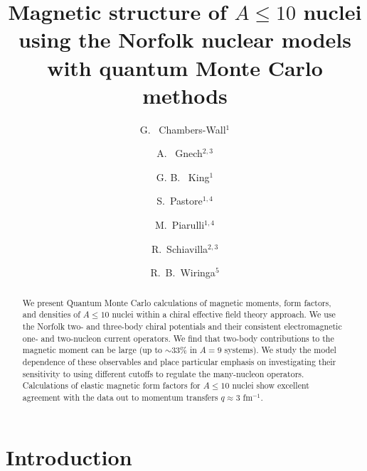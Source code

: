 \documentclass[aps,prc,floatfix,showpacs,twocolumn, preprintnumbers]{revtex4-2}
\begin{document}
\title{Magnetic structure of $A \le 10$ nuclei using the Norfolk nuclear models with quantum Monte Carlo methods}


\author{G. \ Chambers-Wall$^{1}$}
\author{A. \ Gnech$^{2,3}$}
\author{G. B. \ King$^{1}$}
\author{S.\ Pastore$^{1,4}$}
\author{M.\ Piarulli$^{1,4}$}
\author{R.\ Schiavilla$^{2,3}$}
\author{\mbox{R. B.\ Wiringa$^5$}}


\begin{abstract}
We present Quantum Monte Carlo calculations of magnetic moments, form factors, and densities of $A\le 10$ nuclei within a chiral effective field theory approach. We use the Norfolk two- and three-body chiral potentials and their consistent electromagnetic one- and two-nucleon current operators. We find that two-body contributions to the magnetic moment can be large (up to $\sim33\%$ in $A=9$ systems). We study the model dependence of these observables and place particular emphasis on investigating their sensitivity to using different cutoffs to regulate the many-nucleon operators. Calculations of elastic magnetic form factors for $A\leq 10$ nuclei show excellent agreement with the data out to momentum transfers $q\approx 3$ fm$^{-1}$.
\end{abstract}

\maketitle

\section{Introduction}
\label{sec:intro}
\end{document}
